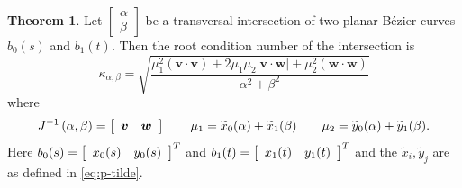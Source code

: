 \documentclass[3p, authoryear, square]{elsarticle}
\theoremstyle{definition}
\newtheorem{theorem}{Theorem}[section]
\begin{document}
\begin{theorem}\label{thm:kappa-closed-form}
Let \(\left[\begin{array}{c} \alpha \\ \beta \end{array}\right]\) be a
transversal intersection of two planar B\'{e}zier curves \(b_0(s)\) and
\(b_1(t)\). Then the root condition number of the intersection is
\begin{equation}\label{eq:kappa-max}
\kappa_{\alpha, \beta} = \sqrt{\frac{\mu_1^2
  \left(\bm{v} \cdot \bm{v}\right) +
  2 \mu_1 \mu_2 \left|\bm{v} \cdot \bm{w}\right| +
  \mu_2^2 \left(\bm{w} \cdot \bm{w}\right)}{\alpha^2 + \beta^2}}
\end{equation}
where
\begin{equation}
  J^{-1}\left(\alpha, \beta\right) = \left[ \begin{array}{c c}
  \bm{v} & \bm{w} \end{array}\right] \qquad
  \mu_1 = \widetilde{x}_0(\alpha) + \widetilde{x}_1(\beta) \qquad
  \mu_2 = \widetilde{y}_0(\alpha) + \widetilde{y}_1(\beta).
\end{equation}
Here \(b_0(s) = \left[\begin{array}{c c} x_0(s) & y_0(s)\end{array}\right]^T\)
and \(b_1(t) = \left[\begin{array}{c c} x_1(t) & y_1(t)\end{array}\right]^T\)
and the \(\widetilde{x}_i, \widetilde{y}_j\) are as defined in
\eqref{eq:p-tilde}.
\end{theorem}
\end{document}
